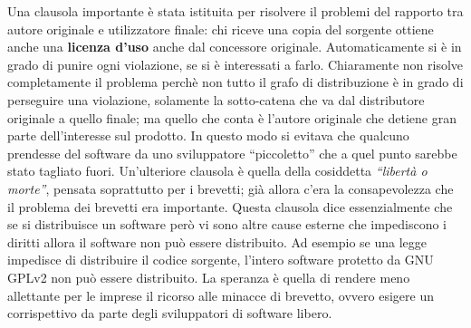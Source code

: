 Una clausola importante è stata istituita per risolvere il problemi del rapporto tra autore originale e utilizzatore finale: chi riceve una copia del sorgente ottiene anche una \textbf{licenza d'uso} anche dal concessore originale. Automaticamente si è in grado di punire ogni violazione, se si è interessati a farlo. Chiaramente non risolve completamente il problema perchè non tutto il grafo di distribuzione è in grado di perseguire una violazione, solamente la sotto-catena che va dal distributore originale a quello finale; ma quello che conta è l'autore originale che detiene gran parte dell'interesse sul prodotto. In questo modo si evitava che qualcuno prendesse del software da uno sviluppatore ``piccoletto'' che a quel punto sarebbe stato tagliato fuori. 
\linebreak
\linebreak
Un'ulteriore clausola è quella della cosiddetta \textit{``libertà o morte''}, pensata soprattutto per i brevetti; già allora c'era la consapevolezza che il problema dei brevetti era importante. Questa clausola dice essenzialmente che se si distribuisce un software però vi sono altre cause esterne che impediscono i diritti allora il software non può essere distribuito. Ad esempio se una legge impedisce di distribuire il codice sorgente, l'intero software protetto da GNU GPLv2 non può essere distribuito. La speranza è quella di rendere meno allettante per le imprese il ricorso alle minacce di brevetto, ovvero esigere un corrispettivo da parte degli sviluppatori di software libero.

